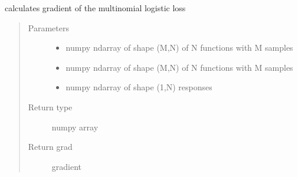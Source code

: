 \documentclass[letterpaper,10pt,english]{sphinxmanual}
\begin{document}
\begin{fulllineitems}
\label{\detokenize{regression:regression.mlogit_gradient}}
calculates gradient of the multinomial logistic loss
\begin{quote}\begin{description}
\item[{Parameters}] \leavevmode\begin{itemize}
\item {} 
 \textendash{} numpy ndarray of shape (M,N) of N functions with M samples

\item {} 
 \textendash{} numpy ndarray of shape (M,N) of N functions with M samples

\item {} 
 \textendash{} numpy ndarray of shape (1,N) responses

\end{itemize}

\item[{Return type}] \leavevmode
numpy array

\item[{Return grad}] \leavevmode
gradient

\end{description}\end{quote}

\end{fulllineitems}

\end{document}
